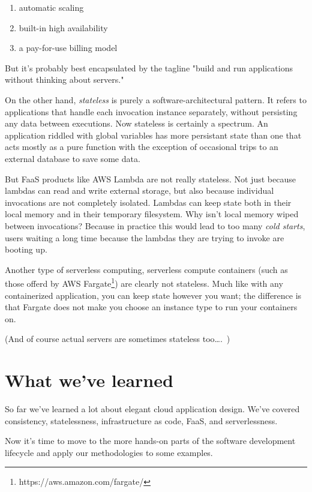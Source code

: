 \documentclass{article}
\newcommand{\noterm}[1]{\textit{#1}}
\newcommand{\term}[1]{\noterm{#1}\index{#1}}
\begin{document}
\begin{enumerate}
    \item automatic scaling
    \item built-in high availability
    \item a pay-for-use billing model
\end{enumerate}

But it's probably best encapsulated by the tagline "build and run applications without thinking about servers."

On the other hand, \term{stateless} is purely a software-architectural pattern.
It refers to applications that handle each invocation instance separately, without persisting any data between executions.
Now stateless is certainly a spectrum.
An application riddled with global variables has more persistant state than one that acts mostly as a pure function with the exception of occasional trips to an external database to save some data.

But FaaS products like AWS Lambda are not really stateless.
Not just because lambdas can read and write external storage, but also because individual invocations are not completely isolated.
Lambdas can keep state both in their local memory and in their temporary filesystem.
Why isn't local memory wiped between invocations?
Because in practice this would lead to too many \term{cold starts}, users waiting a long time because the lambdas they are trying to invoke are booting up.

Another type of serverless computing, serverless compute containers (such as those offerd by AWS Fargate\footnote{https://aws.amazon.com/fargate/}) are clearly not stateless.
Much like with any containerized application, you can keep state however you want; the difference is that Fargate does not make you choose an instance type to run your containers on.

(And of course actual servers are sometimes stateless too\ldots.~\cite{xkcd-1})

\section{What we've learned}

So far we've learned a lot about elegant cloud application design.
We've covered consistency, statelessness, infrastructure as code, FaaS, and serverlessness.

Now it's time to move to the more hands-on parts of the software development lifecycle and apply our methodologies to some examples.
\end{document}
